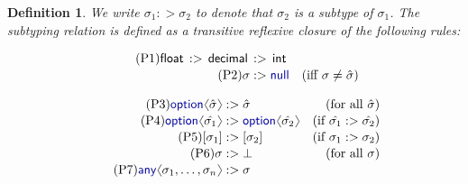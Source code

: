 \documentclass[10pt,preprint,blind,clearpagebib]{sigplanconf}
\newcommand{\langl}{\begin{picture}(4.5,7)
\put(1.1,2.5){\rotatebox{60}{\line(1,0){5.5}}}
\put(1.1,2.5){\rotatebox{300}{\line(1,0){5.5}}}
\end{picture}}
\newcommand{\rangl}{\begin{picture}(4.5,7)
\put(.9,2.5){\rotatebox{120}{\line(1,0){5.5}}}
\put(.9,2.5){\rotatebox{240}{\line(1,0){5.5}}}
\end{picture}}
\newcommand{\kvd}[1]{\textnormal{\textcolor{kvdclr}{\sffamily #1}}}
\newcommand{\ident}[1]{\textnormal{\sffamily #1}}
\newtheorem{definition}{Definition}
\begin{document}
\begin{definition}
We write $\sigma_1 :> \sigma_2$ to denote that $\sigma_2$ is a subtype of $\sigma_1$. The 
subtyping relation is defined as a transitive reflexive closure of the following rules:

\noindent
\begin{align}
  \label{eq:sub-prim}\tag{P1}
  \ident{float}\,:>\,\ident{decimal}\,&:>\,\ident{int}&\\[-0.2em]
  \label{eq:sub-null}\tag{P2}
  \sigma &:> \kvd{null}  &(\textnormal{iff}~\sigma \neq \hat{\sigma}) 
\end{align}

\noindent
\begin{align}
  \label{eq:sub-opt}\tag{P3}
  \kvd{option}\langl\hat{\sigma}\rangl &:> \hat{\sigma}  &(\textnormal{for all}~\hat{\sigma})\\[-0.2em]
  \label{eq:sub-opt-cov}\tag{P4}
  \kvd{option}\langl\hat{\sigma_1}\rangl &:> 
    \kvd{option}\langl\hat{\sigma_2}\rangl  &(\textnormal{if}~\hat{\sigma_1} :> \hat{\sigma_2}) \\[-0.2em]
  \label{eq:sub-col}\tag{P5}
  [\sigma_1] &:> [\sigma_2]  &(\textnormal{if}~\sigma_1 :> \sigma_2) \\[-0.2em]
  \label{eq:sub-bot}\tag{P6}
  \sigma &:> \bot  &(\textnormal{for all}~\sigma)\\[-0.2em]
  \label{eq:sub-var-top}\tag{P7}
  \kvd{any}\langl \sigma_1, \ldots, \sigma_n\rangl &:> \sigma 
\end{align}


\end{definition}
\end{document}
